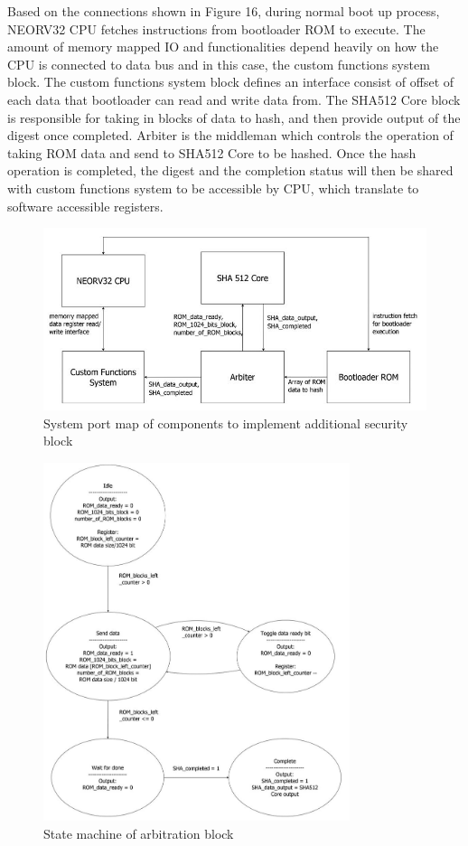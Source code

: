 \documentclass[review]{elsarticle}
\begin{document}
Based on the connections shown in Figure 16, during normal boot up process, NEORV32 CPU fetches instructions from bootloader ROM to execute. The amount of memory mapped IO and functionalities depend heavily on how the CPU is connected to data bus and in this case, the custom functions system block. The custom functions system block defines an interface consist of offset of each data that bootloader can read and write data from. The SHA512 Core block is responsible for taking in blocks of data to hash, and then provide output of the digest once completed. Arbiter is the middleman which controls the operation of taking ROM data and send to SHA512 Core to be hashed. Once the hash operation is completed, the digest and the completion status will then be shared with custom functions system to be accessible by CPU, which translate to software accessible registers.

\begin{figure}[hbt!]
	\centering
	\includegraphics[width=1\textwidth]{figs/SystemPortMap-Amended.JPG}
	\caption{System port map of components to implement additional security block}
\end{figure}


\begin{figure}[hbt!]
	\centering
	\includegraphics[width=0.8\textwidth]{figs/StateMachine.JPG}
	\caption{State machine of arbitration block}
\end{figure}
\end{document}
